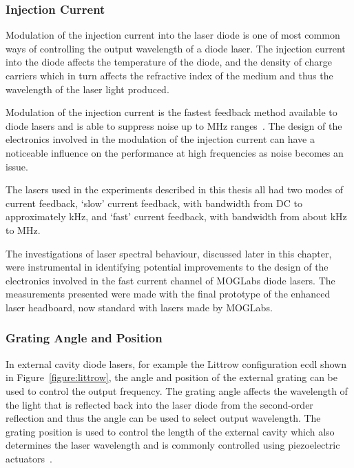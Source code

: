\subsubsection{Injection Current}
Modulation of the injection current into the laser diode is one of most common ways of controlling the output wavelength of a diode laser.
The injection current into the diode affects the temperature of the diode, and the density of charge carriers which in turn affects the refractive index of the medium and thus the wavelength of the laser light produced.

Modulation of the injection current is the fastest feedback method available to diode lasers and is able to suppress noise up to \unit{MHz} ranges~\cite{ludlow_compact_2007,torrance_sub-kilohertz_2016}.
The design of the electronics involved in the modulation of the injection current can have a noticeable influence on the performance at high frequencies as noise becomes an issue.

The lasers used in the experiments described in this thesis all had two modes of current feedback, `slow' current feedback, with bandwidth from DC to approximately \unit[100]{kHz}, and `fast' current feedback, with bandwidth from about \unit[100]{kHz} to \unit[50]{MHz}.

The investigations of laser spectral behaviour, discussed later in this chapter, were instrumental in identifying potential improvements to the design of the electronics involved in the fast current channel of MOGLabs diode lasers.
The measurements presented were made with the final prototype of the enhanced laser headboard, now standard with lasers made by MOGLabs.

\subsubsection{Grating Angle and Position}
In external cavity diode lasers, for example the Littrow configuration \gls{ecdl} shown in Figure~\ref{figure:littrow}, the angle and position of the external grating can be used to control the output frequency.
The grating angle affects the wavelength of the light that is reflected back into the laser diode from the second-order reflection and thus the angle can be used to select output wavelength.
The grating position is used to control the length of the external cavity which also determines the laser wavelength and is commonly controlled using piezoelectric actuators~\cite{hawthorn_littrow_2001}.

